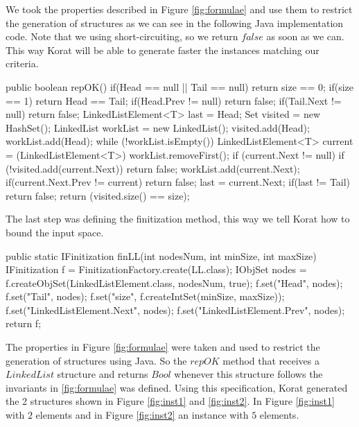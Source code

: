 \begin{code}
We took the properties described in Figure \ref{fig:formulae} and use them to restrict the generation of structures as we can see in the following Java implementation code.
Note that we using short-circuiting, so we return $false$ as soon as we can. This way Korat will be able to generate faster the instances matching our criteria.

\begin{code}
public boolean repOK() {
  if(Head == null || Tail == null)
    return size == 0;
  if(size == 1) return Head == Tail;
  if(Head.Prev != null) return false;
  if(Tail.Next != null) return false;
  LinkedListElement<T> last = Head;
  Set visited = new HashSet();
  LinkedList workList = new LinkedList();
  visited.add(Head);
  workList.add(Head);
  while (!workList.isEmpty()) {
    LinkedListElement<T> current = (LinkedListElement<T>) workList.removeFirst();
    if (current.Next != null) {
      if (!visited.add(current.Next))
	    return false;
      workList.add(current.Next);
      if(current.Next.Prev != current) return false;
      last = current.Next;
    }
  }
  if(last != Tail)
    return false;
  return (visited.size() == size);
}
\end{code}

The last step was defining the finitization method, this way we tell Korat how to bound the input space.

\begin{code}
public static IFinitization finLL(int nodesNum, int minSize, int maxSize) {
  IFinitization f = FinitizationFactory.create(LL.class);
  IObjSet nodes = f.createObjSet(LinkedListElement.class, nodesNum, true);
  f.set("Head", nodes);
  f.set("Tail", nodes);
  f.set("size", f.createIntSet(minSize, maxSize));
  f.set("LinkedListElement.Next", nodes);
  f.set("LinkedListElement.Prev", nodes);
  return f;
}
\end{code}

The properties in Figure \ref{fig:formulae} were taken and used to restrict the generation of structures using Java. So the $repOK$ method that receives
a $LinkedList$ structure and returns $Bool$ whenever this structure follows the invariants in \ref{fig:formulae} was defined.
Using this specification, Korat generated the 2 structures shown in Figure \ref{fig:inst1} and \ref{fig:inst2}. In Figure \ref{fig:inst1} with $2$ elements
and in Figure \ref{fig:inst2} an instance with $5$ elements.


\end{code}
